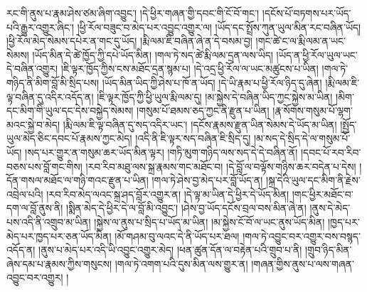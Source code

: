 རང་གི་ནུས་པ་རྣམ་ཤེས་ཙམ་ཞིག་འབྱུང་། །དེ་ཕྱིར་གཞན་གྱི་དབང་གི་ངོ་བོ་གང་། །དངོས་པོ་བཏགས་པར་ཡོད་པའི་རྒྱུར་འགྱུར་ཞིང་། །ཕྱི་རོལ་བཟུང་བ་མེད་པར་འབྱུང་འགྱུར་ལ། །ཡོད་དང་སྤྲོས་ཀུན་ཡུལ་མིན་རང་བཞིན་ཡོད། །ཕྱི་རོལ་མེད་སེམས་དཔེར་ན་གང་དུ་ཡོད། །རྨི་ལམ་ཇི་བཞིན་ཞེ་ན་དེ་བསམ་བྱ། །གང་ཚེ་ང་ལ་རྨི་ལམ་ན་ཡང་སེམས། །ཡོད་མིན་དེ་ཚེ་ཁྱོད་ཀྱི་དཔེ་ཡོད་མིན། །གལ་ཏེ་སད་ཚེ་རྨི་ལམ་དྲན་ལས་ཡིད། །ཡོད་ན་ཕྱི་རོལ་ཡུལ་ཡང་དེ་བཞིན་འགྱུར། །ཇི་ལྟར་ཁྱོད་ཀྱིས་ངས་མཐོང་དྲན་སྙམ་པ། །དེ་འདྲ་ཕྱི་རོལ་ལ་ཡང་མཚུངས་པ་ཡིན། །གལ་ཏེ་གཉིད་ནི་མིག་བློ་མི་སྲིད་པས། །ཡོད་མིན་ཡིད་ཀྱི་ཤེས་པ་ཁོ་ན་ཡོད། །དེ་ཡི་རྣམ་པ་ཕྱི་རོལ་ཉིད་དུ་ཞེན། །རྨི་ལམ་ཇི་ལྟ་བཞིན་དུ་འདིར་འདོད་ན། །ཇི་ལྟར་ཁྱོད་ཀྱི་ཕྱི་ཡུལ་རྨི་ལམ་དུ། །མ་སྐྱེས་དེ་བཞིན་ཡིད་ཀྱང་སྐྱེས་མ་ཡིན། །མིག་དང་མིག་གི་ཡུལ་དང་དེས་བསྐྱེད་སེམས། །གསུམ་པོ་ཐམས་ཅད་ཀྱང་ནི་རྫུན་པ་ཡིན། །རྣ་སོགས་གསུམ་པོ་ལྷག་མའང་སྐྱེ་བ་མེད། །རྨི་ལམ་ཇི་ལྟ་བཞིན་དུ་སད་འདིར་ཡང་། །དངོས་རྣམས་རྫུན་ཡིན་སེམས་དེ་ཡོད་མ་ཡིན། །སྤྱོད་ཡུལ་མེད་ཅིང་དབང་པོ་རྣམས་ཀྱང་མེད། །འདི་ནི་ཇི་ལྟར་སད་བཞིན་ཇི་སྲིད་དུ། །མ་སད་དེ་སྲིད་དེ་ལ་གསུམ་པོ་ཡོད། །སད་པར་གྱུར་ན་གསུམ་ཆར་ཡོད་མིན་ལྟར། །གཏི་མུག་གཉིད་ལས་སད་དེ་དེ་བཞིན་ནོ། །དབང་པོ་རབ་རིབ་བཅས་པས་བློ་གང་གིས། །རབ་རིབ་མཐུ་ལས་སྐྲ་རྣམས་གང་མཐོང་བ། །དེ་བློ་ལ་བལྟོས་གཉིས་ཆར་བདེན་པ་དེས། །དོན་གསལ་མཐོང་ལ་གཉི་གའང་རྫུན་པ་ཡིན། །གལ་ཏེ་ཤེས་བྱ་མེད་པར་བློ་ཡོད་ན། །སྐྲ་དེའི་ཡུལ་དང་མིག་ནི་རྗེས་འབྲེལ་པའི། །རབ་རིབ་མེད་ལའང་སྐྲ་ཤད་བློར་འགྱུར་ན། །དེ་ལྟ་མ་ཡིན་དེ་ཕྱིར་དེ་ཡོད་མིན། །གང་ཕྱིར་མཐོང་བ་དག་ལ་བློ་ནུས་ནི། །སྨིན་མེད་དེ་ཕྱིར་དེ་ལ་བློ་མི་འབྱུང་། །ཤེས་བྱ་ཡོད་དངོས་བྲལ་བས་མིན་ཞེ་ན། །ནུས་དེ་མེད་པས་འདི་ནི་འགྲུབ་མ་ཡིན། །སྐྱེས་ལ་ནུས་པ་སྲིད་པ་ཡོད་མ་ཡིན། །མ་སྐྱེས་ངོ་བོ་ལ་ཡང་ནུས་ཡོད་མིན། །ཁྱད་པར་མེད་པར་ཁྱད་པར་ཅན་ཡོད་མིན། །མོ་གཤམ་བུ་ལའང་དེ་ནི་ཡོད་པར་ཐལ། །གལ་ཏེ་འབྱུང་བར་འགྱུར་བས་བསྙད་འདོད་ན། །ནུས་པ་མེད་པར་འདི་ཡི་འབྱུང་འགྱུར་མེད། །ཕན་ཚུན་དོན་ལ་བརྟེན་པའི་གྲུབ་པ་ནི། །གྲུབ་ཉིད་མིན་ཞེས་དམ་པ་རྣམས་ཀྱིས་གསུངས། །གལ་ཏེ་འགག་པའི་དུས་མིན་ལས་གྱུར་ན། །གཞན་གྱིས་ནུས་པ་ལས་གཞན་འབྱུང་བར་འགྱུར། །
